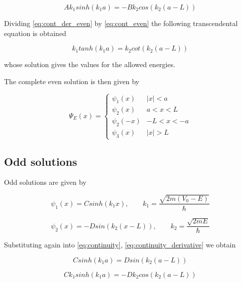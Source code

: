 \documentclass{article}
\begin{document}
\begin{equation}
\label{eq:cont_der_even}
A k_{1} sinh(k_{1}a) = - B k_{2} cos(k_{2}(a-L))
\end{equation}

Dividing \eqref{eq:cont_der_even} by \eqref{eq:cont_even} the following transcendental equation is obtained

\begin{equation}
\label{eq:trans_even}
k_{1} tanh(k_{1}a) = k_{2} cot(k_{2}(a-L))
\end{equation}

whose solution gives the values for the allowed energies.

The complete even solution is then given by

\begin{equation}
\Psi_{E}(x) = 
  \begin{cases} 
      \psi_{1}(x) & \left|x\right| < a \\
      \psi_{2}(x) & a < x < L \\
      \psi_{2}(-x) & -L < x < -a \\
      \psi_{3}(x) & \left|x\right| > L
   \end{cases}
\end{equation}

\subsection{Odd solutions}
Odd solutions are given by

\begin{equation}
\psi_{1}(x) = C sinh(k_{1} x), \qquad k_{1} = \frac{\sqrt{2m(V_{0} - E)}}{\hbar}
\end{equation}

\begin{equation}
\psi_{2}(x) = - D sin(k_{2}(x-L)), \qquad k_{2} = \frac{\sqrt{2mE}}{\hbar}
\end{equation}

Substituting again into \eqref{eq:continuity}, \eqref{eq:continuity_derivative} we obtain

\begin{equation}
\label{eq:cont_odd}
C sinh(k_{1}a) =  D sin(k_{2}(a-L))
\end{equation}

\begin{equation}
\label{eq:cont_der_odd}
C k_{1} sinh(k_{1}a) =  - D k_{2} cos(k_{2}(a-L))
\end{equation}
\end{document}
